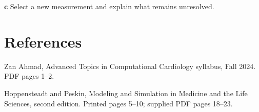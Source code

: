 \documentclass[11pt,letterpaper]{article}
\theoremstyle{definition}\newtheorem{definition}{Definition}\newtheorem{example}{Example}
\numberwithin{equation}{section}
\begin{document}
\textbf{c} Select a new measurement and explain what remains unresolved.

\section*{References}
\noindent\begin{minipage}{\linewidth}
Zan Ahmad, Advanced Topics in Computational Cardiology syllabus, Fall 2024. PDF pages 1--2.

\end{minipage}\par\medskip
\noindent\begin{minipage}{\linewidth}
Hoppensteadt and Peskin, Modeling and Simulation in Medicine and the Life Sciences, second edition. Printed pages 5--10; supplied PDF pages 18--23.

\end{minipage}\par\medskip
\end{document}
